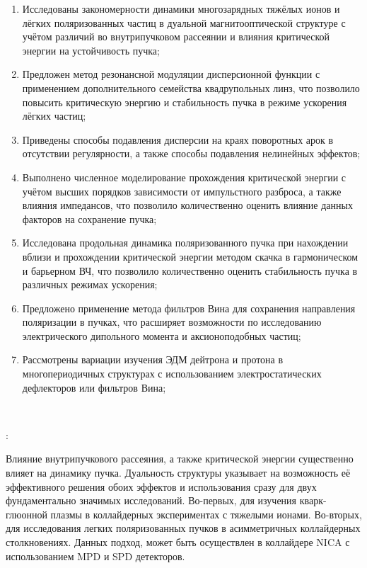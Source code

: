 \begin{enumerate}[beginpenalty=10000] %
    \item	Исследованы закономерности динамики многозарядных тяжёлых ионов и лёгких поляризованных частиц в дуальной магнитооптической структуре с учётом различий во внутрипучковом рассеянии и влияния критической энергии на устойчивость пучка;
  \item 	Предложен метод резонансной модуляции дисперсионной функции с применением дополнительного семейства квадрупольных линз, что позволило повысить критическую энергию и стабильность пучка в режиме ускорения лёгких частиц;
  \item	Приведены способы подавления дисперсии на краях поворотных арок в отсутствии регулярности, а также способы подавления нелинейных эффектов;
  \item 	Выполнено численное моделирование прохождения критической энергии с учётом высших порядков зависимости от импульстного разброса, а также влияния импедансов, что позволило количественно оценить влияние данных факторов на сохранение пучка;
  \item	Исследована продольная динамика поляризованного пучка при нахождении вблизи и прохождении критической энергии методом скачка в гармоническом и барьерном ВЧ, что позволило количественно оценить стабильность пучка в различных режимах ускорения;
  \item	Предложено применение метода фильтров Вина для сохранения направления поляризации в пучках, что расширяет возможности по исследованию электрического дипольного момента и аксионоподобных частиц;
  \item	Рассмотрены вариации изучения ЭДМ дейтрона и протона в многопериодичных структурах с использованием электростатических дефлекторов или фильтров Вина;
\end{enumerate}
~\\
\par {\influence}:
\par Влияние внутрипучкового рассеяния, а также критической энергии существенно влияет на динамику пучка. Дуальность структуры указывает на возможность её эффективного решения обоих эффектов и использования сразу для двух фундаментально значимых исследований. Во-первых, для изучения кварк-глюонной плазмы в коллайдерных экспериментах с тяжелыми ионами. Во-вторых, для исследования легких поляризованных пучков в асимметричных коллайдерных столкновениях. Данных подход, может быть осуществлен в коллайдере NICA с использованием MPD и SPD детекторов.

